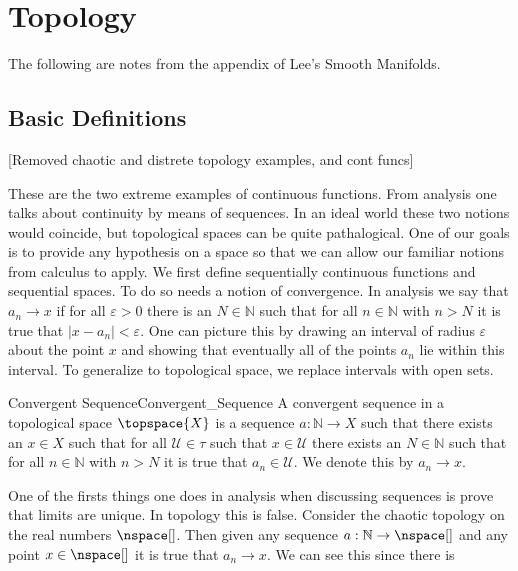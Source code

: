 \section{Topology}
    The following are notes from the appendix of Lee's Smooth Manifolds.
    \subsection{Basic Definitions}

        [Removed chaotic and distrete topology examples, and cont funcs]

        These are the two extreme examples of continuous functions. From
        analysis one talks about continuity by means of sequences. In an
        ideal world these two notions would coincide, but topological spaces
        can be quite pathalogical. One of our goals is to provide any
        hypothesis on a space so that we can allow our familiar notions from
        calculus to apply. We first define sequentially continuous functions
        and sequential spaces. To do so needs a notion of convergence. In
        analysis we say that $a_{n}\rightarrow{x}$ if for all
        $\varepsilon>0$ there is an $N\in\mathbb{N}$ such that for all
        $n\in\mathbb{N}$ with $n>N$ it is true that $|x-a_{n}|<\varepsilon$.
        One can picture this by drawing an interval of radius $\varepsilon$
        about the point $x$ and showing that eventually all of the points
        $a_{n}$ lie within this interval. To generalize to topological
        space, we replace intervals with open sets.
        \begin{fdefinition}{Convergent Sequence}{Convergent_Sequence}
            A convergent sequence in a topological space $\topspace{X}$ is a
            sequence $a:\mathbb{N}\rightarrow{X}$ such that there exists an
            $x\in{X}$ such that for all $\mathcal{U}\in\tau$ such that
            $x\in\mathcal{U}$ there exists an $N\in\mathbb{N}$ such that for
            all $n\in\mathbb{N}$ with $n>N$ it is true that
            $a_{n}\in\mathcal{U}$. We denote this by $a_{n}\rightarrow{x}$.
        \end{fdefinition}
        One of the firsts things one does in analysis when discussing
        sequences is prove that limits are unique. In topology this is
        false. Consider the chaotic topology on the real numbers
        $\nspace[]$. Then given any sequence
        $a:\mathbb{N}\rightarrow\nspace[]$ and any point $x\in\nspace[]$ it
        is true that $a_{n}\rightarrow{x}$. We can see this since there is
